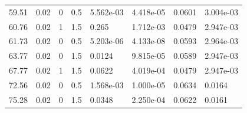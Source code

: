 \documentclass[preview]{standalone}
\begin{document}
{{\begin{tabular}{L{1.2cm}C{1.2cm} C{0.3cm}C{0.5cm} C{1.4cm}C{1.4cm} C{1.4cm}C{1.4cm}}
  59.51  &  0.02  & 0     & 0.5 &  5.562e-03  & 4.418e-05  & 0.0601 &  3.004e-03   \\ 
  60.76  &  0.02  & 1     & 1.5 &  0.265  & 1.712e-03  & 0.0479 &  2.947e-03   \\ 
  61.73  &  0.02  & 0     & 0.5 &  5.203e-06  & 4.133e-08  & 0.0593 &  2.964e-03   \\ 
  63.77  &  0.02  & 0     & 1.5 &  0.0124  & 9.815e-05  & 0.0589 &  2.947e-03   \\ 
  67.77  &  0.02  & 1     & 1.5 &  0.0622  & 4.019e-04  & 0.0479 &  2.947e-03   \\ 
  72.56  &  0.02  & 0     & 0.5 &  1.568e-03  & 1.000e-05  & 0.0634 &  0.0164   \\ 
  75.28  &  0.02  & 0     & 1.5 &  0.0348  & 2.250e-04  & 0.0622 &  0.0161   \\ 
\hline 
\end{tabular} 

}}
\end{document}
